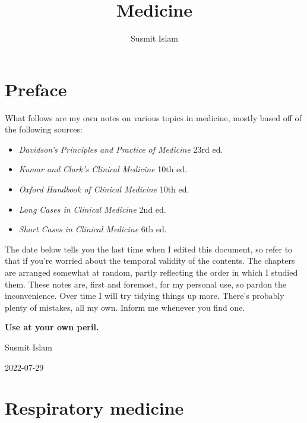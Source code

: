 \documentclass[
  12pt,
]{memoir}
\title{Medicine}
\author{Susmit Islam}
\date{}
\providecommand{\tightlist}{%
  \setlength{\itemsep}{0pt}\setlength{\parskip}{0pt}}
\begin{document}
\frontmatter

\maketitle

\mainmatter
\renewcommand{\labelitemi}{$\blacktriangleright$}
\renewcommand{\labelitemii}{$\boldsymbol\circ$}
\renewcommand{\labelitemiii}{$\bullet$}
\renewcommand{\labelitemiv}{\tiny$\blacksquare$}

\openany
\raggedbottom
\twocoltocetc
\tableofcontents

\pagebreak

\hypertarget{preface}{%
\chapter*{Preface}\label{preface}}

What follows are my own notes on various topics in medicine, mostly
based off of the following sources:

\begin{itemize}
\tightlist
\item
  \emph{Davidson's Principles and Practice of Medicine} 23rd ed.
\item
  \emph{Kumar and Clark's Clinical Medicine} 10th ed.
\item
  \emph{Oxford Handbook of Clinical Medicine} 10th ed.
\item
  \emph{Long Cases in Clinical Medicine} 2nd ed.
\item
  \emph{Short Cases in Clinical Medicine} 6th ed.
\end{itemize}

The date below tells you the last time when I edited this document, so
refer to that if you're worried about the temporal validity of the
contents. The chapters are arranged somewhat at random, partly
reflecting the order in which I studied them. These notes are, first and
foremost, for my personal use, so pardon the inconvenience. Over time I
will try tidying things up more. There's probably plenty of mistakes,
all my own. Inform me whenever you find one.\newline

\textbf{Use at your own peril.}

\hfill Susmit Islam

\hfill 2022-07-29

\hypertarget{respiratory-medicine}{%
\chapter{Respiratory medicine}\label{respiratory-medicine}}
\end{document}
